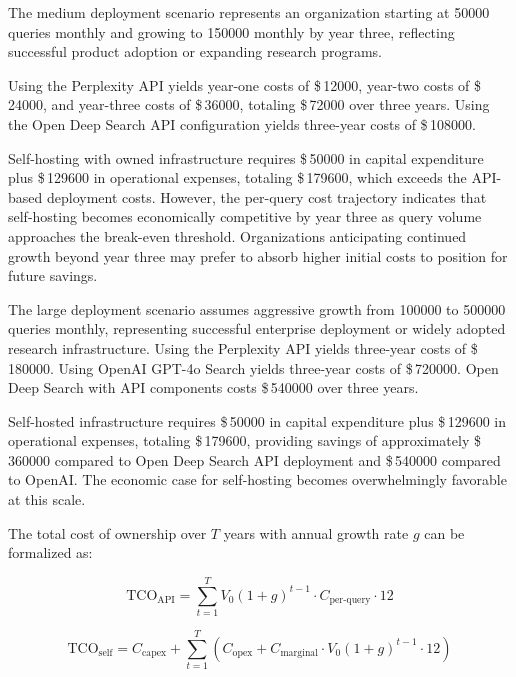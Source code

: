 The medium deployment scenario represents an organization starting at \num{50000} queries monthly and growing to \num{150000} monthly by year three, reflecting successful product adoption or expanding research programs. 

Using the Perplexity API yields year-one costs of \$\,\num{12000}, year-two costs of \$\,\num{24000}, and year-three costs of \$\,\num{36000}, totaling \$\,\num{72000} over three years. Using the Open Deep Search API configuration yields three-year costs of \$\,\num{108000}. 

Self-hosting with owned infrastructure requires \$\,\num{50000} in capital expenditure plus \$\,\num{129600} in operational expenses, totaling \$\,\num{179600}, which exceeds the API-based deployment costs. However, the per-query cost trajectory indicates that self-hosting becomes economically competitive by year three as query volume approaches the break-even threshold. Organizations anticipating continued growth beyond year three may prefer to absorb higher initial costs to position for future savings.


The large deployment scenario assumes aggressive growth from \num{100000} to \num{500000} queries monthly, representing successful enterprise deployment or widely adopted research infrastructure. Using the Perplexity API yields three-year costs of \$\,\num{180000}. Using OpenAI GPT-4o Search yields three-year costs of \$\,\num{720000}. Open Deep Search with API components costs \$\,\num{540000} over three years. 

Self-hosted infrastructure requires \$\,\num{50000} in capital expenditure plus \$\,\num{129600} in operational expenses, totaling \$\,\num{179600}, providing savings of approximately \$\,\num{360000} compared to Open Deep Search API deployment and \$\,\num{540000} compared to OpenAI. The economic case for self-hosting becomes overwhelmingly favorable at this scale.

The total cost of ownership over $T$ years with annual growth rate $g$ can be formalized as:

\begin{equation}
\text{TCO}_{\text{API}} = \sum_{t=1}^{T} V_0(1+g)^{t-1} \cdot C_{\text{per-query}} \cdot 12
\label{eq:tco_api}
\end{equation}

\begin{equation}
\text{TCO}_{\text{self}} = C_{\text{capex}} + \sum_{t=1}^{T} \left(C_{\text{opex}} + C_{\text{marginal}} \cdot V_0(1+g)^{t-1} \cdot 12\right)
\label{eq:tco_self}
\end{equation}


